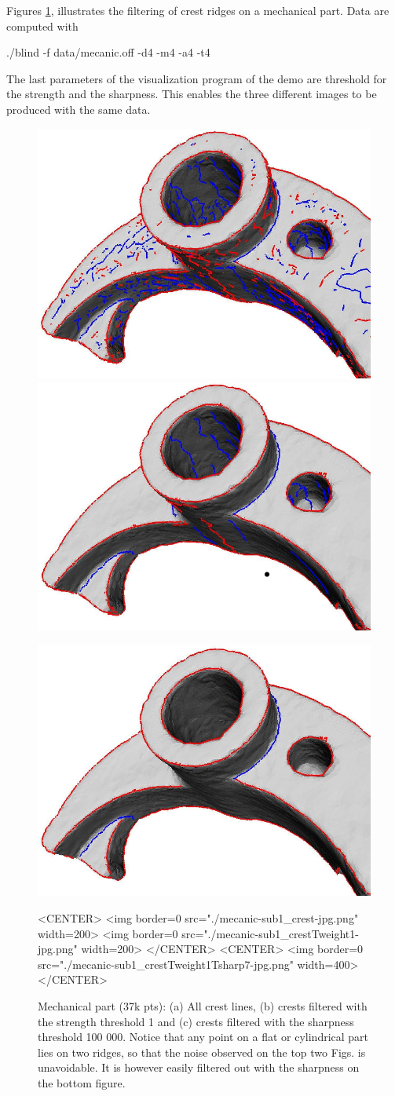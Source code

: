 Figures \ref{fig:mechanical_crest_filtered-intro}, illustrates the
filtering of crest ridges on a mechanical part. Data are computed with 
\begin{ccExampleCode}
./blind -f data/mecanic.off -d4 -m4 -a4 -t4
\end{ccExampleCode}
The last parameters of the visualization program of the demo are
threshold for the strength and the sharpness. This enables the three
different images to be produced with the same data.

\begin{figure}[htb] 
\begin{ccTexOnly}
\centerline{ 
\includegraphics[width=.45\linewidth]{Ridges_3/mecanic-sub1_crest-jpg}
\includegraphics[width=.45\linewidth]{Ridges_3/mecanic-sub1_crestTweight1-jpg}}
\centerline{
\includegraphics[width=.6\linewidth]{Ridges_3/mecanic-sub1_crestTweight1Tsharp7-jpg}}
\end{ccTexOnly}
\caption{Mechanical part (37k pts): (a) All crest lines, (b) crests filtered
with the strength threshold 1 and (c) crests filtered with the sharpness threshold 100 000.
Notice that any point on a flat or cylindrical part lies on two
ridges, so that the noise observed on the top two Figs. is
unavoidable. It is however easily filtered out with the sharpness on
the bottom figure.}
\label{fig:mechanical_crest_filtered-intro} 
\begin{ccHtmlOnly}
<CENTER> <img border=0 src="./mecanic-sub1_crest-jpg.png" width=200>
 <img border=0 src="./mecanic-sub1_crestTweight1-jpg.png" width=200>
</CENTER>
<CENTER>
 <img border=0 src="./mecanic-sub1_crestTweight1Tsharp7-jpg.png" width=400>
</CENTER>
\end{ccHtmlOnly}
\end{figure} 
